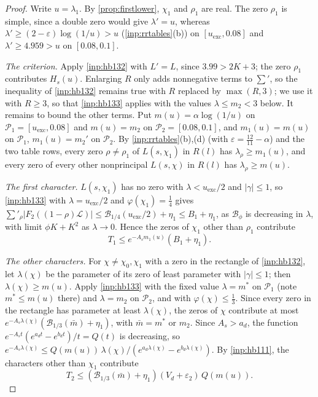 \documentclass[11pt]{amsart}
\numberwithin{equation}{section}
\theoremstyle{plain}
\theoremstyle{definition}
\theoremstyle{remark}
\newcommand{\LL}{\mathcal{L}}
\newcommand{\eps}{\varepsilon}
\newcommand{\1}{\mathbf{1}}
\begin{document}
\begin{proof}
Write $u=\lambda_1$. By \cref{prop:firstlower}, $\chi_1$ and $\rho_1$ are real. The zero $\rho_1$ is simple, since a
double zero would give $\lambda'=u$, whereas $\lambda'\ge(2-\eps)\log(1/u)>u$ (\cref{inp:rrtables}(b)) on
$[u_{\mathrm{exc}},0.08]$ and $\lambda'\ge4.959>u$ on $[0.08,0.1]$.

\emph{The criterion.} Apply \cref{inp:hb132} with $L'=L$, since $3.99>2K+3$; the zero $\rho_1$ contributes
$H_s(u)$. Enlarging $R$ only adds nonnegative terms to $\sum'$, so the inequality of \cref{inp:hb132}
remains true with $R$ replaced by $\max(R,3)$; we use it with $R\ge3$, so that \cref{inp:hb133} applies
with the values $\lambda\le m_2<3$ below. It remains to bound the other terms. Put $m(u)=\alpha\log(1/u)$ on $\mathcal P_1=[u_{\mathrm{exc}},0.08]$ and
$m(u)=m_2$ on $\mathcal P_2=[0.08,0.1]$, and $m_1(u)=m(u)$ on $\mathcal P_1$, $m_1(u)=m_2'$ on $\mathcal P_2$. By
\cref{inp:rrtables}(b),(d) (with $\eps=\frac{12}{11}-\alpha$) and the two table rows, every zero $\rho\ne\rho_1$ of
$L(s,\chi_1)$ in $R(l)$ has $\lambda_\rho\ge m_1(u)$, and every zero of every other nonprincipal $L(s,\chi)$ in
$R(l)$ has $\lambda_\rho\ge m(u)$.

\emph{The first character.} $L(s,\chi_1)$ has no zero with $\lambda<u_{\mathrm{exc}}/2$ and $|\gamma|\le1$, so
\cref{inp:hb133} with $\lambda=u_{\mathrm{exc}}/2$ and $\varphi(\chi_1)=\frac14$ gives
$\sum'_\rho|F_2((1-\rho)\LL)|\le\mathcal B_{1/4}(u_{\mathrm{exc}}/2)+\eta_1\le B_1+\eta_1$, as $\mathcal B_\phi$ is decreasing in $\lambda$, with limit $\phi K+K^2$ as $\lambda\to0$.
Hence the zeros of $\chi_1$ other than $\rho_1$ contribute
\[
  T_1\le e^{-A_sm_1(u)}(B_1+\eta_1).
\]

\emph{The other characters.} For $\chi\ne\chi_0,\chi_1$ with a zero in the rectangle of \cref{inp:hb132},
let $\lambda(\chi)$ be the parameter of its zero of least parameter with $|\gamma|\le1$; then $\lambda(\chi)\ge m(u)$.
Apply \cref{inp:hb133} with the fixed value $\lambda=m^*$ on $\mathcal P_1$ (note $m^*\le m(u)$ there) and $\lambda=m_2$
on $\mathcal P_2$, and with $\varphi(\chi)\le\frac13$. Since every zero in the rectangle has parameter at least
$\lambda(\chi)$, the zeros of $\chi$ contribute at most $e^{-A_s\lambda(\chi)}(\mathcal B_{1/3}(\bar m)+\eta_1)$, with $\bar m=m^*$
or $m_2$. Since $A_s>a_d$, the function $e^{-A_st}(e^{a_dt}-e^{b_dt})/t=Q(t)$ is decreasing, so
$e^{-A_s\lambda(\chi)}\le Q(m(u))\,\lambda(\chi)/(e^{a_d\lambda(\chi)}-e^{b_d\lambda(\chi)})$. By \cref{inp:hb111}, the characters
other than $\chi_1$ contribute
\[
  T_2\le(\mathcal B_{1/3}(\bar m)+\eta_1)(V_d+\eps_2)\,Q(m(u)).
\]


\end{proof}
\end{document}
